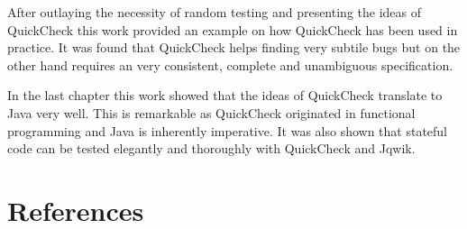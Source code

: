 \documentclass[a4paper, 12pt]{article} %
\begin{document}
After outlaying the necessity of random testing and presenting the ideas of QuickCheck this work provided an example on how QuickCheck has been used in practice. It was found that QuickCheck helps finding very subtile bugs but on the other hand requires an very consistent, complete and unambiguous specification. 


In the last chapter this work showed that the ideas of QuickCheck translate to Java very well. This is remarkable as QuickCheck originated in functional programming and Java is inherently imperative. It was also shown that stateful code can be tested elegantly and thoroughly with QuickCheck and Jqwik. 





\newpage
\section{References}
\printbibliography[heading=none]
\end{document}
